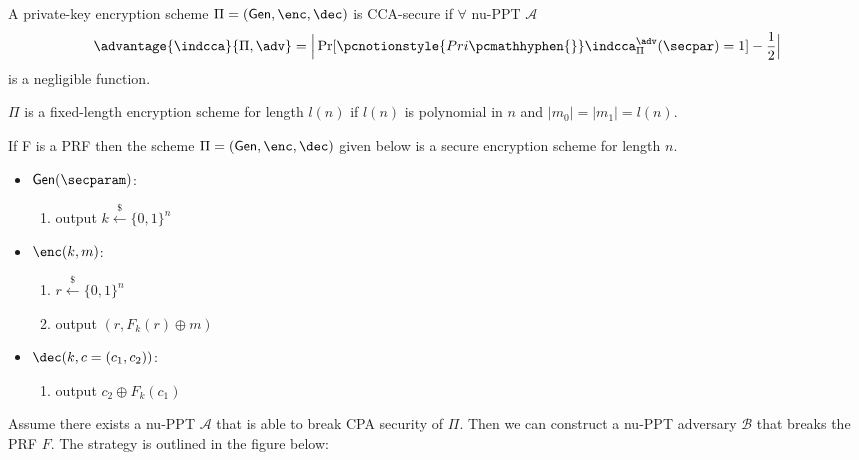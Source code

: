 \documentclass[12pt]{tufte-book}
\newcommand{\ma}{\mathcal{A}}
\newcommand{\mb}{\mathcal{B}}
\newcommand{\getsr}{\xleftarrow{\$}}
\newcommand{\gen}{\mathsf{Gen}}
\begin{document}
\begin{definition}
    A private-key encryption scheme $\Pi = (\gen,\enc,\dec)$ is CCA-secure if $\forall$ nu-PPT $\ma$
    $$\advantage{\indcca}{\Pi,\adv} = \Big| \Pr[\pcnotionstyle{Pri\pcmathhyphen{}}\indcca_\Pi^\adv(\secpar) =1] -\frac{1}{2}\Big|$$
    is a negligible function.
\end{definition}

$\Pi$ is a fixed-length encryption scheme for length $l(n)$ if $l(n)$ is polynomial in $n$ and $|m_0| = |m_1| = l(n)$.

\begin{theorem}
    If F is a PRF then the scheme $\Pi = (\gen, \enc, \dec)$ given below is a secure encryption scheme for length $n$.

    \begin{itemize}
        \item $\gen(\secparam)$:
        \begin{enumerate}
            \item output $k \getsr \{0, 1\}^n$
        \end{enumerate}
        \item $\enc(k, m)$:
        \begin{enumerate}
            \item $r \getsr \{0, 1\}^n$
            \item output $(r, F_k(r) \oplus m)$
        \end{enumerate}
        \item $\dec(k, c=(c_1, c_2))$:
        \begin{enumerate}
            \item output $c_2 \oplus F_k(c_1)$
        \end{enumerate}
    \end{itemize}

\end{theorem}

\proof
Assume there exists a nu-PPT $\ma$ that is able to break CPA security of $\Pi$.
Then we can construct a nu-PPT adversary $\mb$ that breaks the PRF $F$.
The strategy is outlined in the figure below:
\end{document}
